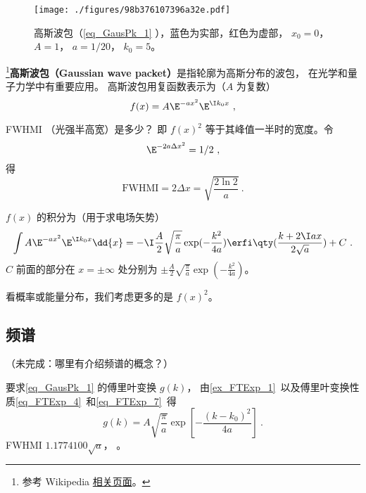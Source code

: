 

\begin{figure}[ht]
\centering
\texttt{[image: ./figures/98b376107396a32e.pdf]}
\caption{高斯波包（\autoref{eq_GausPk_1} ），蓝色为实部，红色为虚部， $x_0 = 0$， $A = 1$， $a = 1/20$， $k_0 = 5$。} \label{fig_GausPk_1}
\end{figure}

\footnote{参考 Wikipedia \href{https://en.wikipedia.org/wiki/Wave_packet}{相关页面}。}\textbf{高斯波包（Gaussian wave packet）}是指轮廓为高斯分布的波包， 在光学和量子力学中有重要应用。 高斯波包用复函数表示为（$A$ 为复数）
\begin{equation}\label{eq_GausPk_1}
f(x) = A \E^{-a x^2}\E^{\I k_0 x}~,
\end{equation}

FWHMI （光强半高宽）是多少？ 即 $f(x)^2$ 等于其峰值一半时的宽度。令
\begin{equation}
\E^{-2a\Delta x^2} = 1/2~,
\end{equation}
得
\begin{equation}
\mathrm{FWHMI} = 2\Delta x = \sqrt{\frac{2\ln 2}{a}}~.
\end{equation}

$f(x)$ 的积分为（用于求电场矢势）
\begin{equation}\label{eq_GausPk_3} %
\int A \E^{-a x^2}\E^{\I k_0 x} \dd{x} = -\I\frac{A}{2} \sqrt{\frac{\pi}{a}} \exp(-\frac{k^2}{4a}) \erfi\qty(\frac{k + 2 \I a x}{2 \sqrt{a}}) + C~.
\end{equation}
$C$ 前面的部分在 $x = \pm \infty$ 处分别为 $\pm\frac{A}{2} \sqrt{\frac{\pi}{a}} \exp(-\frac{k^2}{4a})$。%

看概率或能量分布，我们考虑更多的是 $f(x)^2$。

\subsection{频谱}
（未完成：哪里有介绍频谱的概念？）

要求\autoref{eq_GausPk_1} 的傅里叶变换 $g(k)$， 由\autoref{ex_FTExp_1}~以及傅里叶变换性质\autoref{eq_FTExp_4}~和\autoref{eq_FTExp_7}~得
\begin{equation} %
g(k) = A\sqrt{\frac{\pi}{a}} \exp[-\frac{(k-k_0)^2}{4a}]~.
\end{equation}
FWHMI $1.1774100 \sqrt{a}$， 。


